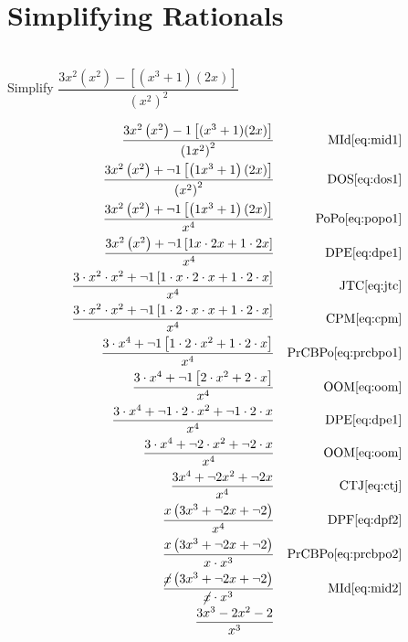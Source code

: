 \documentclass[20150903-160354-rs2.2-MarksMathNotebook.tex]{subfiles}
\begin{document}
%
%

\chapter{Simplifying Rationals}

\begin{example}[id:20151015-160832] \label{20151015-160832} \hfill \\

Simplify $\dfrac{3x^2 \left(x^2 \right)-\left[(x^3+1)(2x)\right]}{\left(x^2\right)^2}$
\soln

\solnsteps
\begin{align*}
\dfrac{3x^2 \left(x^2 \right)-1 \left[(x^3+1)(2x)\right]}{\left(1x^2\right)^2}  && \text{MId} \eqref{eq:mid1} \\
\dfrac{3x^2 \left(x^2 \right)+\neg 1\left[\left(1x^3+1\right)(2x) \right]}{\left(x^2\right)^2} && \text{DOS} \eqref{eq:dos1} \\
\dfrac{3x^2 \left(x^2 \right)+\neg 1\left[\left(1x^3+1\right)(2x) \right]}{x^4} && \text{PoPo} \eqref{eq:popo1} \\
\dfrac{3x^2 \left(x^2 \right)+\neg 1\left[1x \cdot 2x + 1 \cdot 2x \right]}{x^4} && \text{DPE} \eqref{eq:dpe1} \\
\dfrac{3 \cdot x^2 \cdot x^2 +\neg 1\left[1 \cdot x \cdot 2 \cdot x + 1 \cdot 2 \cdot x \right]}{x^4} && \text{JTC} \eqref{eq:jtc} \\
\dfrac{3 \cdot x^2 \cdot x^2 +\neg 1\left[1 \cdot 2 \cdot x \cdot x + 1 \cdot 2 \cdot x \right]}{x^4} && \text{CPM} \eqref{eq:cpm} \\
\dfrac{3 \cdot x^4 +\neg 1\left[1 \cdot 2 \cdot x^2 + 1 \cdot 2 \cdot x \right]}{x^4} && \text{PrCBPo} \eqref{eq:prcbpo1} \\
\dfrac{3 \cdot x^4 +\neg 1\left[2 \cdot x^2 + 2 \cdot x \right]}{x^4} && \text{OOM} \eqref{eq:oom} \\
\dfrac{3 \cdot x^4 + \neg 1 \cdot 2 \cdot x^2 +  \neg 1 \cdot 2 \cdot x }{x^4} && \text{DPE} \eqref{eq:dpe1} \\
\dfrac{3 \cdot x^4 +\neg 2\cdot x^2  +  \neg 2 \cdot x}{x^4} && \text{OOM} \eqref{eq:oom} \\
\dfrac{3x^4 +\neg 2x^2  +  \neg 2x}{x^4} && \text{CTJ} \eqref{eq:ctj} \\
\dfrac{x \left(3x^3 +\neg 2x  +  \neg 2 \right)}{x^4} && \text{DPF} \eqref{eq:dpf2} \\ 
\dfrac{x \left(3x^3 +\neg 2x  +  \neg 2 \right)}{x \cdot x^3} && \text{PrCBPo} \eqref{eq:prcbpo2} \\
\dfrac{\cancel{x}\left(3x^3 +\neg 2x  +  \neg 2 \right)}{\cancel{x} \cdot x^3} && \text{MId} \eqref{eq:mid2} \\
\dfrac{3x^3-2x^2-2}{x^3}
\end{align*}
\end{example}
\end{document}
